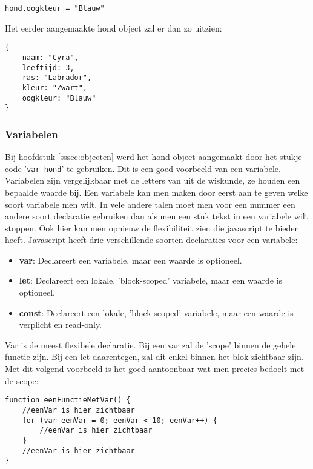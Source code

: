 \begin{lstlisting}[frame=single, caption=Eigenschap toevoegen aan en object]
hond.oogkleur = "Blauw"
\end{lstlisting}

Het eerder aangemaakte hond object zal er dan zo uitzien:

\begin{lstlisting}[frame=single, caption=Het nieuwe hond object]
{
	naam: "Cyra",
 	leeftijd: 3,
 	ras: "Labrador",
 	kleur: "Zwart",
 	oogkleur: "Blauw"
}
\end{lstlisting}

\subsubsection{Variabelen}
\label{sssec:variabelen}
Bij hoofdstuk \ref{sssec:objecten} werd het hond object aangemaakt door het stukje code '\lstinline[basicstyle=\ttfamily\color{red}]|var hond|' te gebruiken. Dit is een goed voorbeeld van een variabele. Variabelen zijn vergelijkbaar met de letters van uit de wiskunde, ze houden een bepaalde waarde bij. Een variabele kan men maken door eerst aan te geven welke soort variabele men wilt. In vele andere talen moet men voor een nummer een andere soort declaratie gebruiken dan als men een stuk tekst in een variabele wilt stoppen. Ook hier kan men opnieuw de flexibiliteit zien die javascript te bieden heeft. Javascript heeft drie verschillende soorten declaraties voor een variabele:

\begin{itemize}
	\item \textbf{var}: Declareert een variabele, maar een waarde is optioneel.
	\item \textbf{let}: Declareert een lokale, 'block-scoped' variabele, maar een waarde is optioneel.
	\item \textbf{const}: Declareert een lokale, 'block-scoped' variabele, maar een waarde is verplicht en read-only.
\end{itemize}

Var is de meest flexibele declaratie. Bij een var zal de 'scope' binnen de gehele functie zijn. Bij een let daarentegen, zal dit enkel binnen het blok zichtbaar zijn. Met dit volgend voorbeeld is het goed aantoonbaar wat men precies bedoelt met de scope:

\begin{lstlisting}[frame=single, caption=Een functie met var]
function eenFunctieMetVar() {
	//eenVar is hier zichtbaar
	for (var eenVar = 0; eenVar < 10; eenVar++) {
		//eenVar is hier zichtbaar
	}
	//eenVar is hier zichtbaar
}
\end{lstlisting}

